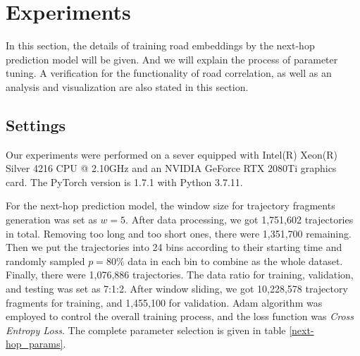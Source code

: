 
\section{Experiments}
In this section, the details of training road embeddings by the next-hop prediction model will be given. And we will explain the process of parameter tuning. A verification for the functionality of road correlation, as well as an analysis and visualization are also stated in this section.

\subsection{Settings}
Our experiments were performed on a sever equipped with Intel(R) Xeon(R) Silver 4216 CPU @ 2.10GHz and an NVIDIA GeForce RTX 2080Ti graphics card. The PyTorch\cite{pytorch} version is 1.7.1 with Python 3.7.11.

For the next-hop prediction model, the window size for trajectory fragments generation was set as $w=5$. After data processing, we got 1,751,602 trajectories in total. Removing too long and too short ones, there were 1,351,700 remaining. Then we put the trajectories into 24 bins according to their starting time and randomly sampled $p=80\%$ data in each bin to combine as the whole dataset. Finally, there were 1,076,886 trajectories. The data ratio for training, validation, and testing was set as 7:1:2. After window sliding, we got 10,228,578 trajectory fragments for training, and 1,455,100 for validation. Adam\cite{adam} algorithm was employed to control the overall training process, and the loss function was \textit{Cross Entropy Loss}. The complete parameter selection is given in table \ref{next-hop_params}.

